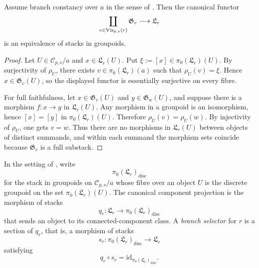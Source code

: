 \begin{corollary}\label{cor:branch-decomposition}
Assume branch constancy over $a$ in the sense of . Then the canonical functor
\[
\coprod_{v\in \mathrm{Vis}_{p,s}(r)} \mathfrak G_v\longrightarrow \mathfrak L_r
\]
is an equivalence of stacks in groupoids.
\end{corollary}

\begin{proof}
Let $U\in \mathcal C_{p,s}/a$ and $x\in \mathfrak L_r(U)$. Put $\xi:=[x]\in \pi_0(\mathfrak L_r)(U)$. By surjectivity of $\rho_U$, there exists $v\in \pi_0(\mathfrak L_r)(a)$ such that $\rho_U(v)=\xi$. Hence $x\in \mathfrak G_v(U)$, so the displayed functor is essentially surjective on every fibre.

For full faithfulness, let $x\in \mathfrak G_v(U)$ and $y\in \mathfrak G_w(U)$, and suppose there is a morphism $f:x\to y$ in $\mathfrak L_r(U)$. Any morphism in a groupoid is an isomorphism, hence $[x]=[y]$ in $\pi_0(\mathfrak L_r)(U)$. Therefore $\rho_U(v)=\rho_U(w)$. By injectivity of $\rho_U$, one gets $v=w$. Thus there are no morphisms in $\mathfrak L_r(U)$ between objects of distinct summands, and within each summand the morphism sets coincide because $\mathfrak G_v$ is a full substack.
\end{proof}

\begin{definition}\label{def:branch-selector}
In the setting of , write
\[
\pi_0(\mathfrak L_r)_{\mathrm{disc}}
\]
for the stack in groupoids on $\mathcal C_{p,s}/a$ whose fibre over an object $U$ is the discrete groupoid on the set $\pi_0(\mathfrak L_r)(U)$. The canonical component projection is the morphism of stacks
\[
q_r:\mathfrak L_r\longrightarrow \pi_0(\mathfrak L_r)_{\mathrm{disc}}
\]
that sends an object to its connected-component class. A \emph{branch selector} for $r$ is a section of $q_r$, that is, a morphism of stacks
\[
s_r:\pi_0(\mathfrak L_r)_{\mathrm{disc}}\longrightarrow \mathfrak L_r
\]
satisfying
\[
q_r\circ s_r=\mathrm{id}_{\pi_0(\mathfrak L_r)_{\mathrm{disc}}}.
\]
\end{definition}

